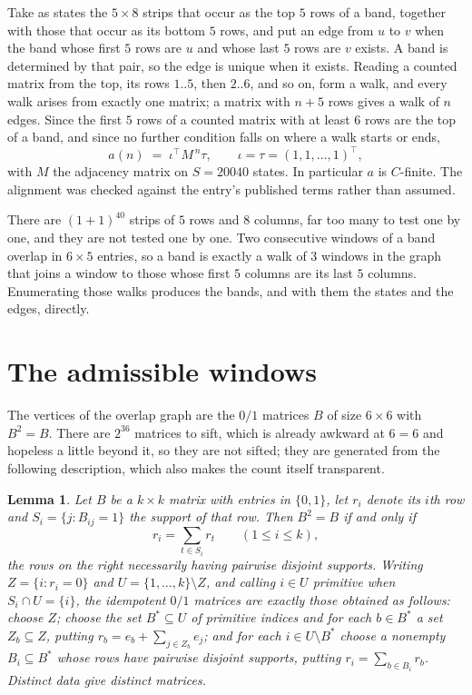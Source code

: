 \documentclass[11pt,a4paper]{article}
\theoremstyle{plain}
\newtheorem{lemma}[theorem]{Lemma}
\theoremstyle{definition}
\begin{document}
Take as states the $5\times8$ strips that occur as the top $5$ rows of a band,
together with those that occur as its bottom $5$ rows, and put an edge from $u$ to $v$
when the band whose first $5$ rows are $u$ and whose last $5$ rows are $v$ exists.
A band is determined by that pair, so the edge is unique when it exists. Reading a counted
matrix from the top, its rows $1..5$, then $2..6$, and so on, form a walk, and every
walk arises from exactly one matrix; a matrix with $n+5$ rows gives a walk of $n$ edges.
Since the first $5$ rows of a counted matrix with at least $6$ rows are the top of a
band, and since no further condition falls on where a walk starts or ends,
\[
a(n)\;=\;\iota^{\!\top}M^{\,n}\tau ,\qquad \iota=\tau=(1,1,\dots,1)^{\!\top},
\]
with $M$ the adjacency matrix on $S=20040$ states. In particular $a$ is $C$-finite. The
alignment was checked against the entry's published terms rather than assumed.

There are $(1 + 1)^{40}$ strips of $5$ rows and $8$ columns, far too
many to test one by one, and they are not tested one by one. Two consecutive windows of a band
overlap in $6\times5$ entries, so a band is exactly a walk of $3$ windows in
the graph that joins a window to those whose first $5$ columns are its last $5$
columns. Enumerating those walks produces the bands, and with them the states and the edges,
directly.

\section{The admissible windows}

The vertices of the overlap graph are the $0/1$ matrices $B$ of size $6\times6$ with
$B^2=B$. There are $2^{36}$ matrices to sift, which is already awkward at $6=6$ and
hopeless a little beyond it, so they are not sifted; they are generated from the following
description, which also makes the count itself transparent.

\begin{lemma}\label{lem:idem}
Let $B$ be a $k\times k$ matrix with entries in $\{0,1\}$, let $r_i$ denote its $i$th row and
$S_i=\{j:B_{ij}=1\}$ the support of that row. Then $B^2=B$ if and only if
\[
r_i=\sum_{t\in S_i}r_t \qquad (1\le i\le k),
\]
the rows on the right necessarily having pairwise disjoint supports. Writing
$Z=\{i:r_i=0\}$ and $U=\{1,\dots,k\}\setminus Z$, and calling $i\in U$ \emph{primitive}
when $S_i\cap U=\{i\}$, the idempotent $0/1$ matrices are exactly those obtained as follows:
choose $Z$; choose the set $B^{\ast}\subseteq U$ of primitive indices and for each
$b\in B^{\ast}$ a set $Z_b\subseteq Z$, putting $r_b=e_b+\sum_{j\in Z_b}e_j$; and for each
$i\in U\setminus B^{\ast}$ choose a nonempty $B_i\subseteq B^{\ast}$ whose rows have
pairwise disjoint supports, putting $r_i=\sum_{b\in B_i}r_b$. Distinct data give distinct
matrices.
\end{lemma}
\end{document}

